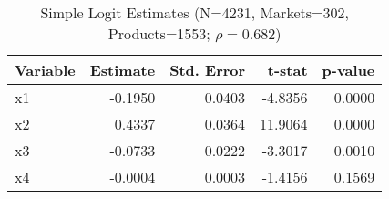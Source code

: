 \begin{table}[!htbp]
\centering
\caption{Simple Logit Estimates (N=4231, Markets=302, Products=1553; $\rho=0.682$)}
\label{tab:blp_logit_coef}
\begin{tabular}{lrrrr}
\toprule
Variable & Estimate & Std. Error & t-stat & p-value \\
\midrule
x1 & -0.1950 & 0.0403 & -4.8356 & 0.0000 \\
x2 & 0.4337 & 0.0364 & 11.9064 & 0.0000 \\
x3 & -0.0733 & 0.0222 & -3.3017 & 0.0010 \\
x4 & -0.0004 & 0.0003 & -1.4156 & 0.1569 \\
\bottomrule
\end{tabular}

\end{table}
